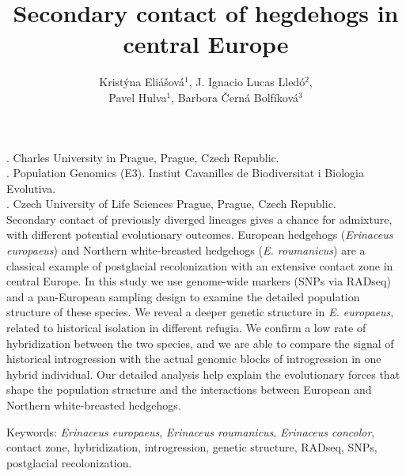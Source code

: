 \documentclass{article}
\author{Kristýna Eliá\v{s}ová$^1$, J. Ignacio Lucas Lledó$^2$,\\Pavel Hulva$^1$, Barbora \v{C}erná Bolfíková$^3$}
\title{Secondary contact of hegdehogs in central Europe}
\date{\vspace{-5ex}}
\begin{document}
\maketitle
{}. Charles University in Prague, Prague, Czech Republic.\\
. Population Genomics (E3). Instiut Cavanilles de Biodiversitat i Biologia Evolutiva.\\
. Czech University of Life Sciences Prague, Prague, Czech Republic.\\

Secondary contact of previously diverged lineages gives a chance for admixture,
with different potential evolutionary outcomes. European hedgehogs (\emph{Erinaceus europaeus})
and Northern white-breasted hedgehogs (\emph{E. roumanicus}) are a classical example of postglacial
recolonization with an extensive contact zone in central Europe. In this study we use genome-wide
markers (SNPs via RADseq) and a pan-European sampling design to examine the detailed population structure
of these species. We reveal a deeper genetic structure in \emph{E. europaeus}, related to historical isolation
in different refugia. We confirm a low rate of hybridization between the two species, and we are able
to compare the signal of historical introgression with the actual genomic blocks of introgression
in one hybrid individual. Our detailed analysis help explain the evolutionary forces that shape
the population structure and the interactions between European and Northern white-breasted hedgehogs.

\vspace*{1cm}
Keywords: \emph{Erinaceus europaeus}, \emph{Erinaceus roumanicus}, \emph{Erinaceus concolor},
contact zone, hybridization, introgression, genetic structure, RADseq, SNPs, postglacial recolonization.
\end{document}
